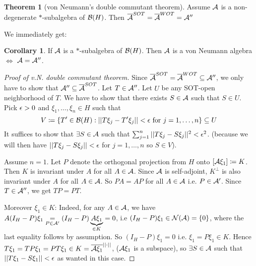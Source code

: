 \documentclass[10pt,english,a4paper]{article}
\theoremstyle{definition}
\newtheorem*{theorem}{Theorem}
\newtheorem*{corollary}{Corollary}
\begin{document}
\begin{theorem}[von Neumann's double commutant theorem]
    Assume $\mathcal{A}$ is a non-degenerate $*$-subalgebra of $\mathcal{B}(H)$. 
Then $\overline{\mathcal{A}}^{SOT} = \overline{\mathcal{A}}^{WOT} = \mathcal{A}''$ 
\end{theorem}
We immediately get:
\begin{corollary}
    If $\mathcal{A}$ is a $*$-subalgebra of $\mathcal{B}(H)$. Then $\mathcal{A}$ is a von
Neumann algebra $\iff$ $\mathcal{A} = \mathcal{A}''$.
\end{corollary}
\begin{proof}[Proof of v.N. double commutant theorem]
    Since $\overline{\mathcal{A}}^{SOT} = \overline{\mathcal{A}}^{WOT} \subseteq \mathcal{A}''$, we 
only have to show that $\mathcal{A}'' \subseteq \overline{\mathcal{A}}^{SOT}$.
Let $T \in \mathcal{A}''$. Let $U$ be any SOT-open neighborhood of $T$. We have 
to show that there exists $S \in \mathcal{A}$ such that $S \in U$. Pick 
$\epsilon > 0$ and $\xi_1,\ldots, \xi_n \in H$ such that 
\[ V\coloneqq \{ T' \in \mathcal{B}(H) : ||T\xi_j - T'\xi_j|| < \epsilon \text{ for }j
=1,\ldots,n \} \subseteq U\]
It suffices to show that $\exists S \in \mathcal{A}$ such that 
$\sum_{j=1}^{n} ||T\xi_j - S\xi_j||^2 < \epsilon^2$.
(because we will then have $||T\xi_j - S\xi_j || < \epsilon$ for $j=1,\ldots, n$
so $S \in V$).

Assume $n=1$. Let $P$ denote the orthogonal projection from $H$ onto
$[\mathcal{A}\xi_1] \coloneqq K$. Then $K$ is invariant under $A$ for all $A \in \mathcal{A}$.
Since $\mathcal{A}$ is self-adjoint, $K^{\perp}$ is also invariant under $A$ for all $A
\in \mathcal{A}$. So $PA = AP$ for all $A \in \mathcal{A}$ i.e. $P\in \mathcal{A}'$.
Since $T \in \mathcal{A}''$, we get $TP=PT$. 

Moreover $\xi_1 \in K$:
Indeed, for any $A \in \mathcal{A}$, we have $A(I_H - P)\xi_1 \underset{P\in \mathcal{A}'}{=}
(I_H-P)\underbrace{A\xi_1}_{\in
K} = 0$, i.e $(I_H -P)\xi_1 \in \mathcal{N}(\mathcal{A}) = \{0\}$, where the last equality
follows by assumption. So $(I_H - P)\xi_1 = 0$ i.e. $\xi_1 = P\xi_1 \in K$.
Hence $T\xi_1 = TP\xi_1 = PT\xi_1 \in K = \overline{\mathcal{A}\xi_1}^{||\cdot||}$,
($\mathcal{A}\xi_1$ is a subspace), 
so $\exists S \in \mathcal{A} $ such that $||T\xi_1 - S\xi_1|| < \epsilon$ as wanted in this case.


\end{proof}
\end{document}
